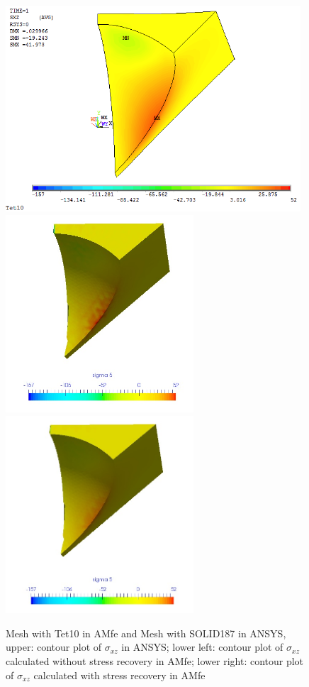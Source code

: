 \begin{figure}[htbp]
	\begin{center}
		\includegraphics[width=11cm,clip]{Tet10_Sxz.png} 		
		\includegraphics[width=7cm,clip]{Tet10_Sxz_PD.png} 	
		\includegraphics[width=7cm,clip]{Tet10_Sxz_P.png} 		
		\caption{Mesh with Tet10 in AMfe and Mesh with SOLID187 in ANSYS, upper: contour plot of $\sigma_{xz}$ in ANSYS; lower left: contour plot of $\sigma_{xz}$ calculated without stress recovery in AMfe; lower right: contour plot of $\sigma_{xz}$ calculated with stress recovery in AMfe} \label{fig: Tet10_Sxz}
	\end{center}
\end{figure}
\clearpage 

